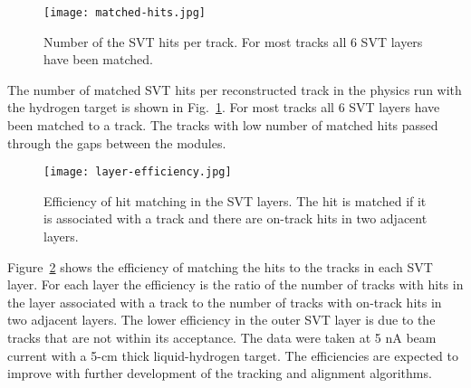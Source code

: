 \begin{figure}[hbt] 
\centering 
\texttt{[image: matched-hits.jpg]}
\caption{Number of the SVT hits per track. For most tracks all 6 SVT layers have been matched.}
\label{fig:matched-hits}
\end{figure}

The number of matched SVT hits per reconstructed track in the physics run with the hydrogen target is shown in Fig.~\ref{fig:matched-hits}. For most tracks all 6 SVT layers have been matched to a track. The tracks with low number of matched hits passed through the gaps between the modules.


\begin{figure}[hbt] 
\centering 
\texttt{[image: layer-efficiency.jpg]}
\caption{Efficiency of hit matching in the SVT layers. The hit is matched if it is associated with a track and there are on-track hits in two adjacent layers.}
\label{fig:layer-efficiency}
\end{figure}

Figure~\ref{fig:layer-efficiency} shows the efficiency of matching the hits to the tracks in each SVT layer. For each layer the efficiency is the ratio of the number of tracks with hits in the layer associated with a track to the number of tracks with on-track hits in two adjacent layers. The lower efficiency in the outer SVT layer is due to the tracks that are not within its acceptance. The data were taken at 5 nA beam current with a 5-cm thick liquid-hydrogen target. The efficiencies are expected to improve with further development of the tracking and alignment algorithms. 
